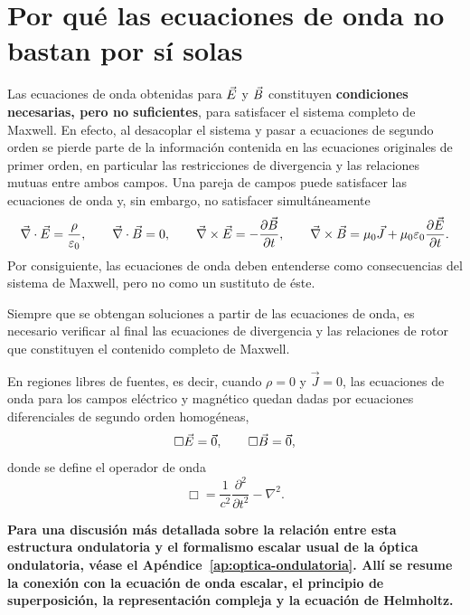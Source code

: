 \documentclass[../main.tex]{subfiles}
\begin{document}
\section{Por qué las ecuaciones de onda no bastan por sí solas}

Las ecuaciones de onda obtenidas para $\vec{E}$ y $\vec{B}$ constituyen \textbf{condiciones necesarias, pero no suficientes}, para satisfacer el sistema completo de Maxwell. En efecto, al desacoplar el sistema y pasar a ecuaciones de segundo orden se pierde parte de la información contenida en las ecuaciones originales de primer orden, en particular las restricciones de divergencia y las relaciones mutuas entre ambos campos. Una pareja de campos puede satisfacer las ecuaciones de onda y, sin embargo, no satisfacer simultáneamente
\begin{equation*}
    \vec\nabla\cdot\vec{E}=\frac{\rho}{\varepsilon_0},
    \qquad
    \vec\nabla\cdot\vec{B}=0,
    \qquad
    \vec\nabla\times\vec{E}=-\frac{\partial\vec{B}}{\partial t},
    \qquad
    \vec\nabla\times\vec{B}=\mu_0\vec{J}+\mu_0\varepsilon_0\frac{\partial\vec{E}}{\partial t}.
\end{equation*}
Por consiguiente, las ecuaciones de onda deben entenderse como consecuencias del sistema de Maxwell, pero no como un sustituto de éste.

\begin{cuidado}
Siempre que se obtengan soluciones a partir de las ecuaciones de onda, es necesario verificar al final las ecuaciones de divergencia y las relaciones de rotor que constituyen el contenido completo de Maxwell.
\end{cuidado}

En regiones libres de fuentes, es decir, cuando $\rho=0$ y $\vec J=0$, las ecuaciones de onda para los campos eléctrico y magnético quedan dadas por ecuaciones diferenciales de segundo orden homogéneas,
\begin{equation*}
    \Box\vec{E}=\vec 0,
    \qquad
    \Box\vec{B}=\vec 0,
\end{equation*}
donde se define el operador de onda
\begin{equation*}
    \Box=\frac{1}{c^2}\frac{\partial^2}{\partial t^2}-\nabla^2.
\end{equation*}





\textbf{Para una discusión más detallada sobre la relación entre esta estructura ondulatoria y el formalismo escalar usual de la óptica ondulatoria, véase el Apéndice~\ref{ap:optica-ondulatoria}. Allí se resume la conexión con la ecuación de onda escalar, el principio de superposición, la representación compleja y la ecuación de Helmholtz.}
\end{document}
